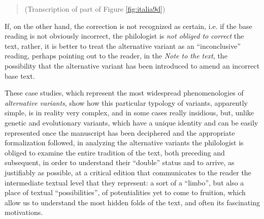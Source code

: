 \begin{paper}
\begin{minipage}[H]{\textwidth}
\begin{quote}
\begin{center}
\end{center}
\begin{flushright}
(Transcription of part of Figure \ref{fig:italia9d})
\end{flushright}
\end{quote}
\end{minipage}

\noindent If, on the other hand, the correction is not recognized as certain, i.e.
if the base reading is not obviously incorrect, the philologist is
\emph{not obliged to correct} the text, rather, it is better to
treat the alternative variant as an ``inconclusive'' reading, perhaps
pointing out to the reader, in the \emph{Note to the text}, the
possibility that the alternative variant has been introduced to amend an
incorrect base text.

These case studies, which represent the most widespread phenomenologies
of \emph{alternative variants}, show how this particular typology of
variants, apparently simple, is in reality very complex, and in some
cases really insidious, but, unlike genetic and evolutionary variants,
which have a unique identity and can be easily represented once the
manuscript has been deciphered and the appropriate formalization
followed, in analyzing the alternative variants the philologist is
obliged to examine the entire tradition of the text, both preceding and
subsequent, in order to understand their ``double'' status and to arrive,
as justifiably as possible, at a critical edition that communicates to
the reader the intermediate textual level that they represent: a sort of
a ``limbo'', but also a place of textual ``possibilities'', of
potentialities yet to come to fruition, which allow us to understand the
most hidden folds of the text, and often its fascinating motivations.

\begin{flushleft}
    \renewcommand*{\mkbibnamefamily}[1]{\textsc{#1}}
    \renewcommand*{\mkbibnamegiven}[1]{\textsc{#1}} 
\printbibliography
\end{flushleft}
\end{paper}